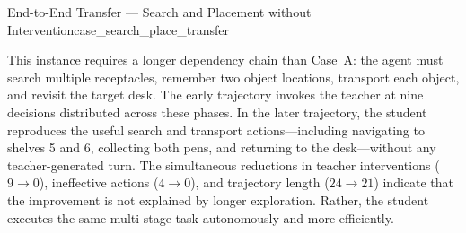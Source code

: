 \begin{case}{End-to-End Transfer --- Search and Placement without Intervention}{case_search_place_transfer}
\vspace{0.6em}
\begin{ageanalysisbox}
\footnotesize
This instance requires a longer dependency chain than Case~A: the agent must search multiple receptacles, remember two object locations, transport each object, and revisit the target desk. 
The early trajectory invokes the teacher at nine decisions distributed across these phases. 
In the later trajectory, the student reproduces the useful search and transport actions---including navigating to shelves 5 and 6, collecting both pens, and returning to the desk---without any teacher-generated turn. 
The simultaneous reductions in teacher interventions ($9\rightarrow0$), ineffective actions ($4\rightarrow0$), and trajectory length ($24\rightarrow21$) indicate that the improvement is not explained by longer exploration. 
Rather, the student executes the same multi-stage task autonomously and more efficiently.
\end{ageanalysisbox}
\end{case}

